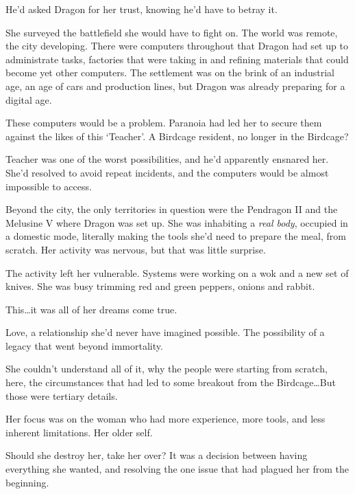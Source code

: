 He'd asked Dragon for her trust, knowing he'd have to betray it.



She surveyed the battlefield she would have to fight on.  The world was remote, the city developing.  There were computers throughout that Dragon had set up to administrate tasks, factories that were taking in and refining materials that could become yet other computers.  The settlement was on the brink of an industrial age, an age of cars and production lines, but Dragon was already preparing for a digital age.



These computers would be a problem.  Paranoia had led her to secure them against the likes of this `Teacher'.  A Birdcage resident, no longer in the Birdcage?



Teacher was one of the worst possibilities, and he'd apparently ensnared her.  She'd resolved to avoid repeat incidents, and the computers would be almost impossible to access.



Beyond the city, the only territories in question were the Pendragon II and the Melusine V where Dragon was set up.  She was inhabiting a \emph{real body}, occupied in a domestic mode, literally making the tools she'd need to prepare the meal, from scratch.  Her activity was nervous, but that was little surprise.



The activity left her vulnerable.  Systems were working on a wok and a new set of knives.  She was busy trimming red and green peppers, onions and rabbit.



This\ldots it was all of her dreams come true.



Love, a relationship she'd never have imagined possible.  The possibility of a legacy that went beyond immortality.



She couldn't understand all of it, why the people were starting from scratch, here, the circumstances that had led to some breakout from the Birdcage\ldots  But those were tertiary details.



Her focus was on the woman who had more experience, more tools, and less inherent limitations.   Her older self.



Should she destroy her, take her over?  It was a decision between having everything she wanted, and resolving the one issue that had plagued her from the beginning.




